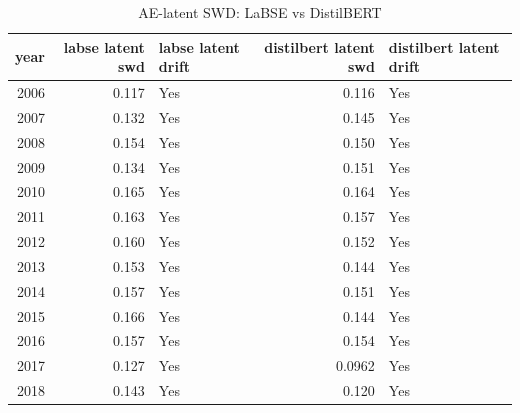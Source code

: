 \begin{table}[ht]
\centering
\caption{AE-latent SWD: LaBSE vs DistilBERT}
\label{tab:labse_vs_distilbert_latent_swd}
\begin{tabular}{rrlrl}
\toprule
year & labse latent swd & labse latent drift & distilbert latent swd & distilbert latent drift \\
\midrule
2006 & 0.117 & Yes & 0.116 & Yes \\
2007 & 0.132 & Yes & 0.145 & Yes \\
2008 & 0.154 & Yes & 0.150 & Yes \\
2009 & 0.134 & Yes & 0.151 & Yes \\
2010 & 0.165 & Yes & 0.164 & Yes \\
2011 & 0.163 & Yes & 0.157 & Yes \\
2012 & 0.160 & Yes & 0.152 & Yes \\
2013 & 0.153 & Yes & 0.144 & Yes \\
2014 & 0.157 & Yes & 0.151 & Yes \\
2015 & 0.166 & Yes & 0.144 & Yes \\
2016 & 0.157 & Yes & 0.154 & Yes \\
2017 & 0.127 & Yes & 0.0962 & Yes \\
2018 & 0.143 & Yes & 0.120 & Yes \\
\bottomrule
\end{tabular}
\end{table}
